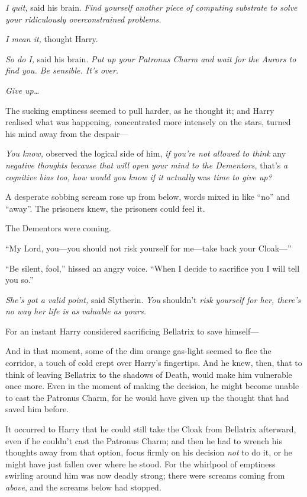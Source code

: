 \emph{I quit,} said his brain. \emph{Find yourself another piece of
computing substrate to solve your ridiculously overconstrained
problems.}

\emph{I mean it,} thought Harry.

\emph{So do I,} said his brain. \emph{Put up your Patronus Charm and
wait for the Aurors to find you. Be sensible. It's over.}

\emph{Give up\ldots{}}

The sucking emptiness seemed to pull harder, as he thought it; and Harry
realised what was happening, concentrated more intensely on the stars,
turned his mind away from the despair---

\emph{You know,} observed the logical side of him, \emph{if you're not
allowed to think} any \emph{negative thoughts because that will open
your mind to the Dementors,} that's \emph{a cognitive bias too, how
would you know if it actually} was \emph{time to give up?}

A desperate sobbing scream rose up from below, words mixed in like
``no'' and ``away''. The prisoners knew, the prisoners could feel it.

The Dementors were coming.

``My Lord, you---you should not risk yourself for me---take back your
Cloak---''

``Be silent, fool,'' hissed an angry voice. ``When I decide to sacrifice
you I will tell you so.''

\emph{She's got a valid point,} said Slytherin. \emph{You} shouldn't
\emph{risk yourself for her, there's no way her life is as valuable as
yours.}

For an instant Harry considered sacrificing Bellatrix to save himself---

And in that moment, some of the dim orange gas-light seemed to flee the
corridor, a touch of cold crept over Harry's fingertips. And he knew,
then, that to think of leaving Bellatrix to the shadows of Death, would
make him vulnerable once more. Even in the moment of making the
decision, he might become unable to cast the Patronus Charm, for he
would have given up the thought that had saved him before.

It occurred to Harry that he could still take the Cloak from Bellatrix
afterward, even if he couldn't cast the Patronus Charm; and then he had
to wrench his thoughts away from that option, focus firmly on his
decision \emph{not} to do it, or he might have just fallen over where he
stood. For the whirlpool of emptiness swirling around him was now deadly
strong; there were screams coming from \emph{above}, and the screams
below had stopped.

